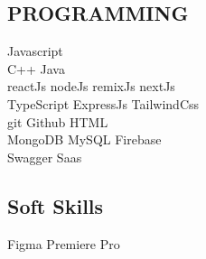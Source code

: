 \documentclass[]{deedy-resume-openfont}
\begin{document}
\begin{minipage}[t]{0.33\textwidth}
\subsection{PROGRAMMING}
Javascript \\
\sectionsep
{}
C++ \textbullet{} Java \\
\sectionsep
{}
reactJs \textbullet{} nodeJs \textbullet{} remixJs \textbullet{} nextJs \\
TypeScript \textbullet{}  ExpressJs \textbullet{} TailwindCss  \\ 
git \textbullet{} Github \textbullet{} HTML \\
MongoDB \textbullet{} MySQL \textbullet{} Firebase    \\ 
\sectionsep
{}
Swagger \textbullet{} Saas  \\

\sectionsep


\subsection{Soft Skills}
Figma \textbullet{} Premiere Pro 
\sectionsep


%
%

\end{minipage} 
\hfill
\end{document}
